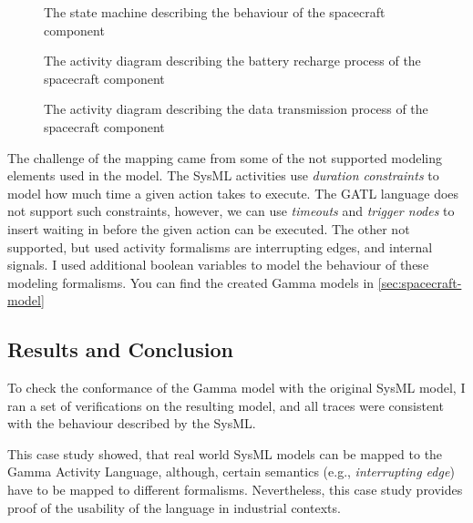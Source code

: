 \begin{figure}[!ht]
	\centering
	
	\caption{The state machine describing the behaviour of the spacecraft component}
	\label{fig:spacecraft_modes}
\end{figure}

\begin{figure}[!ht]
	\centering
	
	\caption{The activity diagram describing the battery recharge process of the spacecraft component}
	\label{fig:recharge_batteries}
\end{figure}

\begin{figure}[!ht]
	\centering
	
	\caption{The activity diagram describing the data transmission process of the spacecraft component}
	\label{fig:transmit_data}
\end{figure}

The challenge of the mapping came from some of the not supported modeling elements used in the model. The SysML activities use \emph{duration constraints} to model how much time a given action takes to execute. The GATL language does not support such constraints, however, we can use \emph{timeouts} and \emph{trigger nodes} to insert waiting in before the given action can be executed. The other not supported, but used activity formalisms are interrupting edges, and internal signals. I used additional boolean variables to model the behaviour of these modeling formalisms. You can find the created Gamma models in \autoref{sec:spacecraft-model}

\subsection{Results and Conclusion}

To check the conformance of the Gamma model with the original SysML model, I ran a set of verifications on the resulting model, and all traces were consistent with the behaviour described by the SysML.

This case study showed, that real world SysML models can be mapped to the Gamma Activity Language, although, certain semantics (e.g., \emph{interrupting edge}) have to be mapped to different formalisms. Nevertheless, this case study provides proof of the usability of the language in industrial contexts.